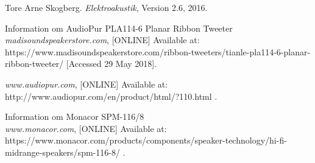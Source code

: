 \begin{thebibliography}{9}


	Tore Arne Skogberg.
	\textit{Elektroakustik},
	Version 2.6,
	2016.
	
	Information om AudioPur PLA114-6 Planar Ribbon Tweeter \\
	\textit{madisoundspeakerstore.com},
	[ONLINE] Available at:\\ https://www.madisoundspeakerstore.com/ribbon-tweeters/tianle-pla114-6-planar-ribbon-tweeter/ 
	[Accessed 29 May 2018].
	
	\textit{www.audiopur.com},
	[ONLINE] Available at:\\ http://www.audiopur.com/en/product/html/?110.html 
	.

	Information om Monacor SPM-116/8 \\
	\textit{www.monacor.com},
	[ONLINE] Available at:\\ https://www.monacor.com/products/components/speaker-technology/hi-fi-midrange-speakers/spm-116-8/
	.
	
	


\end{thebibliography}